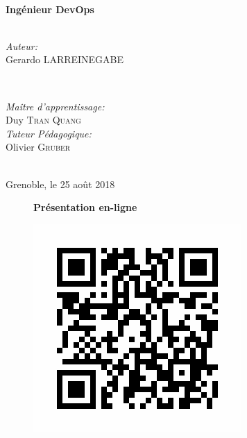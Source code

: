 \documentclass[12pt]{article}
\begin{document}
\begin{titlepage}
\HRule \\[0.4cm]
{ \huge \bfseries Ingénieur DevOps}\\[0.4cm]
\HRule \\[1cm]


\begin{minipage}{0.4\textwidth}
\begin{flushleft} \large
\emph{Auteur:}\\
Gerardo \textsc{LARREINEGABE} \\
\end{flushleft}
\end{minipage}
~
\begin{minipage}{0.5\textwidth}
\begin{flushright} \large
\emph{Maître d’apprentissage:} \\
Duy \textsc{Tran Quang} \\[0.5cm] %
\emph{Tuteur Pédagogique:} \\
Olivier \textsc{Gruber} %
\end{flushright}
\end{minipage}\\[1cm]


{\large Grenoble, le 25 août 2018}\\[0.5cm]


\vfill %
\newpage
\end{titlepage}

\vfill
\begin{figure}
    \centering
    \textbf{Présentation en-ligne}\par\medskip
    \includegraphics [scale=0.9] {slide-url.png}
\end{figure}
\vfill
\clearpage
\end{document}

